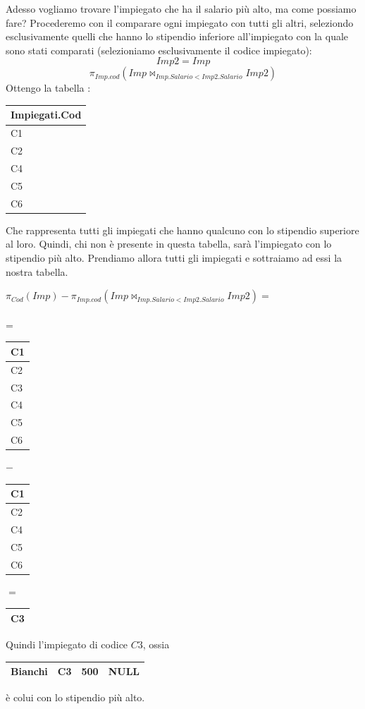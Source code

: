 \documentclass[12pt, letterpaper]{article}
\begin{document}
Adesso vogliamo trovare l'impiegato che ha il salario più alto, ma come possiamo fare? Procederemo con il comparare 
ogni impiegato con tutti gli altri, seleziondo esclusivamente quelli che hanno lo stipendio inferiore all'impiegato 
con la quale sono stati comparati (selezioniamo esclusivamente il codice impiegato):\begin{equation}
    Imp2=Imp
\end{equation}
\begin{equation}
    \pi_{Imp.cod}(Imp \Join_{Imp.Salario<Imp2.Salario}Imp2)
\end{equation}
\newpage Ottengo la tabella :
\begin{center}
    \begin{tabular}{|l|}
        \hline
        Impiegati.Cod \\ \hline
        C1            \\ \hline
        C2            \\ \hline
        C4            \\ \hline
        C5            \\ \hline
        C6            \\ \hline
        \end{tabular}
\end{center}
Che rappresenta tutti gli impiegati che hanno qualcuno con lo stipendio superiore al loro. Quindi,
chi non è presente in questa tabella, sarà l'impiegato con lo stipendio più alto. Prendiamo allora tutti 
gli impiegati e sottraiamo ad essi la nostra tabella.
\begin{center}
    \(\pi_{Cod}(Imp)-\pi_{Imp.cod}(Imp \Join_{Imp.Salario<Imp2.Salario}Imp2)=\)\\\hphantom{.}\\=
    \begin{tabular}{|l|}
        \hline
        C1 \\ \hline
        C2 \\ \hline
        C3 \\ \hline
        C4 \\ \hline
        C5 \\ \hline
        C6 \\ \hline
        \end{tabular} \(-\)
        \begin{tabular}{|l|}
            \hline
            C1 \\ \hline
            C2 \\ \hline
            C4 \\ \hline
            C5 \\ \hline
            C6 \\ \hline
            \end{tabular}
            \(=\)
    \begin{tabular}{|l|}
        \hline
        C3 \\ \hline
        \end{tabular}
\end{center}
Quindi l'impiegato di codice \(C3\), ossia \begin{tabular}{|l|l|l|l|}
    \hline
    Bianchi & C3 & 500 & NULL \\ \hline
    \end{tabular} è colui con lo stipendio più alto. 
\end{document}
